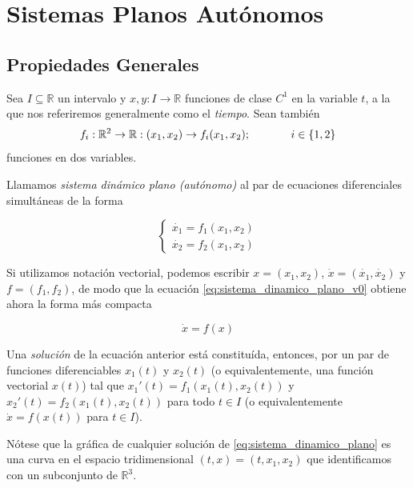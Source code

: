 \documentclass[11pt]{book}
\theoremstyle{definition}
\numberwithin{definition}{section}
\theoremstyle{theorem}
\numberwithin{theorem}{section}
\numberwithin{lemma}{section}
\numberwithin{corollary}{section}
\theoremstyle{plain}
\numberwithin{example}{section}
\newcommand{\R}{{\ensuremath{\mathbb{R}}}}
\begin{document}

\chapter{Sistemas Planos Autónomos}
\label{cap:sistemasplanosautonomos}

\section{Propiedades Generales}
\label{sec:propiedades_generales}

Sea $I \subseteq \R$ un intervalo y $x,y:I \rightarrow \R$ funciones de clase $C^1$ en la variable $t$, a la que nos referiremos generalmente como el \textit{tiempo}.
Sean también $$f_i : \R^2 \rightarrow \R: (x_1, x_2) \rightarrow f_i(x_1, x_2); \hspace{0.5in} i \in \{1,2\}$$ funciones en dos variables.

Llamamos \emph{sistema dinámico plano (autónomo)} al par de ecuaciones diferenciales simultáneas de la forma

\begin{equation} \label{eq:sistema_dinamico_plano_v0}
\left\{
    \begin{array}{l}
        \dot{x_1} = f_1(x_1, x_2) \\
        \dot{x_2} = f_2(x_1, x_2)
    \end{array} \right.
\end{equation}

Si utilizamos notación vectorial, podemos escribir $x = (x_1, x_2)$, $\dot{x} = (\dot{x_1}, \dot{x_2})$ y $f = (f_1, f_2)$, de modo que la ecuación \ref{eq:sistema_dinamico_plano_v0} obtiene ahora la forma más compacta

\begin{equation} \label{eq:sistema_dinamico_plano}
    \dot{x} = f(x)
\end{equation}

Una \emph{solución} de la ecuación anterior está constituída, entonces, por un par de funciones diferenciables $x_1(t)$ y $x_2(t)$ (o equivalentemente, una función vectorial $x(t)$) tal que $x_1'(t) = f_1(x_1(t), x_2(t))$ y $x_2'(t) = f_2(x_1(t), x_2(t))$ para todo $t \in I$ (o equivalentemente $\dot{x} = f(x(t))$ para $t \in I$).

Nótese que la gráfica de cualquier solución de \ref{eq:sistema_dinamico_plano} es una curva en el espacio tridimensional $(t,x)=(t,x_1,x_2)$ que identificamos con un subconjunto de $\R^3$.
\end{document}
